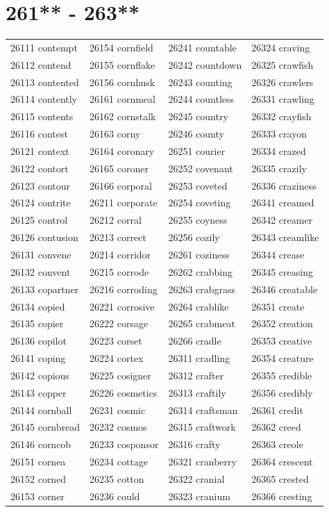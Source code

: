 \documentclass[10pt, oneside]{book}
\begin{document}
\begin{table}
	\centering
	\section*{261** - 263**}
	\begin{tabular}{l l l l}
26111 contempt &26154 cornfield &26241 countable &26324 craving\\
26112 contend &26155 cornflake &26242 countdown &26325 crawfish\\
26113 contented &26156 cornhusk &26243 counting &26326 crawlers\\
26114 contently &26161 cornmeal &26244 countless &26331 crawling\\
26115 contents &26162 cornstalk &26245 country &26332 crayfish\\
26116 contest &26163 corny &26246 county &26333 crayon\\
26121 context &26164 coronary &26251 courier &26334 crazed\\
26122 contort &26165 coroner &26252 covenant &26335 crazily\\
26123 contour &26166 corporal &26253 coveted &26336 craziness\\
26124 contrite &26211 corporate &26254 coveting &26341 creamed\\
26125 control &26212 corral &26255 coyness &26342 creamer\\
26126 contusion &26213 correct &26256 cozily &26343 creamlike\\
26131 convene &26214 corridor &26261 coziness &26344 crease\\
26132 convent &26215 corrode &26262 crabbing &26345 creasing\\
26133 copartner &26216 corroding &26263 crabgrass &26346 creatable\\
26134 copied &26221 corrosive &26264 crablike &26351 create\\
26135 copier &26222 corsage &26265 crabmeat &26352 creation\\
26136 copilot &26223 corset &26266 cradle &26353 creative\\
26141 coping &26224 cortex &26311 cradling &26354 creature\\
26142 copious &26225 cosigner &26312 crafter &26355 credible\\
26143 copper &26226 cosmetics &26313 craftily &26356 credibly\\
26144 cornball &26231 cosmic &26314 craftsman &26361 credit\\
26145 cornbread &26232 cosmos &26315 craftwork &26362 creed\\
26146 corncob &26233 cosponsor &26316 crafty &26363 creole\\
26151 cornea &26234 cottage &26321 cranberry &26364 crescent\\
26152 corned &26235 cotton &26322 cranial &26365 crested\\
26153 corner &26236 could &26323 cranium &26366 cresting\\
	\end{tabular}
 \end{table}
\clearpage
\end{document}
